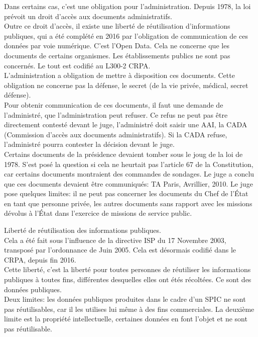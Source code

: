 \documentclass[10pt, a4paper, openany]{book}
\begin{document}
Dans certains cas, c'est une obligation pour l'administration. Depuis 1978, la loi prévoit un droit d'accès aux documents administratifs. \\
Outre ce droit d'accès, il existe une liberté de réutilisation d'informations publiques, qui a été complété en 2016 par l'obligation de communication de ces données par voie numérique. C'est l'Open Data. Cela ne concerne que les documents de certains organismes. Les établissements publics ne sont pas concernés. Le tout est codifié au L300-2 CRPA. \\
L'administration a obligation de mettre à disposition ces documents. Cette obligation ne concerne pas la défense, le secret (de la vie privée, médical, secret défense). \\
Pour obtenir communication de ces documents, il faut une demande de l'administré, que l'administration peut refuser. Ce refus ne peut pas être directement contesté devant le juge, l'administré doit saisir une AAI, la CADA (Commission d'accès aux documents administratifs). Si la CADA refuse, l'administré pourra contester la décision devant le juge. \\
Certains documents de la présidence devaient tomber sous le joug de la loi de 1978. S'est posé la question si cela ne heurtait pas l'article 67 de la Constitution, car certains documents montraient des commandes de sondages. Le juge a conclu que ces documents devaient être communiqués: TA Paris, Avrillier, 2010. Le juge pose quelques limites: il ne peut pas concerner les documents du Chef de l'État en tant que personne privée, les autres documents sans rapport avec les missions dévolus à l'État dans l'exercice de missions de service public. 


Liberté de réutilisation des informations publiques. \\
Cela a été fait sous l'influence de la directive ISP du 17 Novembre 2003, transposé par l'ordonnance de Juin 2005. Cela est désormais codifié dans le CRPA, depuis fin 2016. \\
Cette liberté, c'est la liberté pour toutes personnes de réutiliser les informations publiques à toutes fins, différentes desquelles elles ont étés récoltées. Ce sont des données publiques. \\
Deux limites: les données publiques produites dans le cadre d'un SPIC ne sont pas réutilisables, car il les utilises lui même à des fins commerciales. La deuxième limite est la propriété intellectuelle, certaines données en font l'objet et ne sont pas réutilisable.
\end{document}
